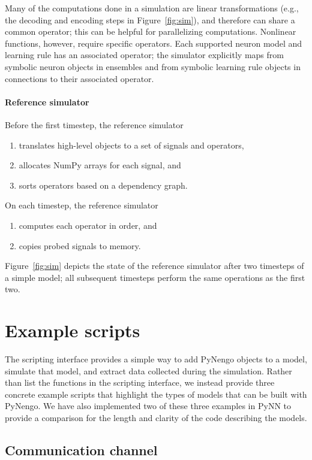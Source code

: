 \documentclass{frontiersSCNS}
\begin{document}
Many of the computations
done in a simulation
are linear transformations (e.g.,
the decoding and encoding steps
in Figure~\ref{fig:sim}),
and therefore can share a common operator;
this can be helpful for parallelizing computations.
Nonlinear functions, however,
require specific operators.
Each supported neuron model and learning rule
has an associated operator;
the simulator explicitly maps
from symbolic neuron objects in ensembles
and from symbolic learning rule objects
in connections to their associated operator.

\paragraph{Reference simulator}

Before the first timestep, the reference simulator
\begin{enumerate}
  \item translates high-level objects to
    a set of signals and operators,
  \item allocates NumPy arrays for each signal, and
  \item sorts operators based on a dependency graph.
\end{enumerate}
On each timestep, the reference simulator
\begin{enumerate}
  \item computes each operator in order, and
  \item copies probed signals to memory.
\end{enumerate}
Figure~\ref{fig:sim} depicts
the state of the reference simulator
after two timesteps of a simple model;
all subsequent timesteps perform the same
operations as the first two.

\section{Example scripts} \label{sec:examples}

The scripting interface provides
a simple way to add PyNengo objects to a model,
simulate that model,
and extract data collected during the simulation.
Rather than list the functions in the scripting interface,
we instead provide three concrete example scripts
that highlight the types of models that can be
built with PyNengo.
We have also implemented two of these three examples
in PyNN to provide a comparison
for the length and clarity of the code
describing the models.

\subsection{Communication channel} \label{sec:comm-channel}
\end{document}
